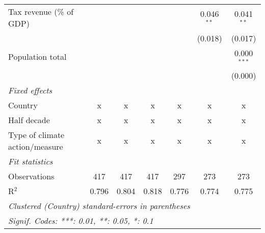 \begin{tabular}{lcccccc}
   Tax revenue (\% of GDP)                &         &                &                &                & 0.046$^{**}$   & 0.041$^{**}$\\   
                                          &         &                &                &                & (0.018)        & (0.017)\\   
   Population total                       &         &                &                &                &                & 0.000$^{***}$\\   
                                          &         &                &                &                &                & (0.000)\\   
   \emph{Fixed effects}\\
   Country                                & x       & x              & x              & x              & x              & x\\  
   Half decade                            & x       & x              & x              & x              & x              & x\\  
   Type of climate action/measure         & x       & x              & x              & x              & x              & x\\  
   \midrule \emph{Fit statistics}\\
   Observations                           & 417     & 417            & 417            & 297            & 273            & 273\\  
   R$^2$                                  & 0.796   & 0.804          & 0.818          & 0.776          & 0.774          & 0.775\\  
   \midrule
   \multicolumn{7}{l}{\emph{Clustered (Country) standard-errors in parentheses}}\\
   \multicolumn{7}{l}{\emph{Signif. Codes: ***: 0.01, **: 0.05, *: 0.1}}\\
\end{tabular}
\par\endgroup


